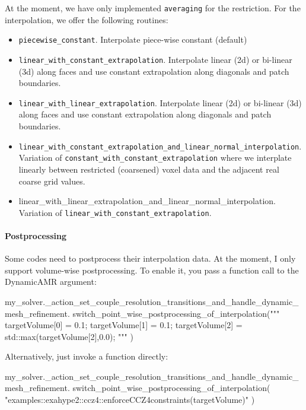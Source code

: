 At the moment, we have only implemented \texttt{averaging} for the restriction. 
For the interpolation, we offer the following routines:

\begin{itemize}
  \item \texttt{piecewise\_constant}. Interpolate piece-wise constant (default) 
  \item \texttt{linear\_with\_constant\_extrapolation}. Interpolate linear (2d) or
  bi-linear (3d) along faces and use constant extrapolation along diagonals and
  patch boundaries.
  \item \texttt{linear\_with\_linear\_extrapolation}. Interpolate linear (2d) or
  bi-linear (3d) along faces and use constant extrapolation along diagonals and
  patch boundaries.
  \item \texttt{linear\_with\_constant\_extrapolation\_and\_linear\_normal\_interpolation}.
  Variation of \texttt{constant\_with\_constant\_extrapolation} where we
  interplate linearly between restricted (coarsened) voxel data and the adjacent real
  coarse grid values. 
  \item{linear\_with\_linear\_extrapolation\_and\_linear\_normal\_interpolation}. \linebreak
  Variation of \texttt{linear\_with\_constant\_extrapolation}. 
\end{itemize}


\paragraph{Postprocessing}
%
%
%
Some codes need to postprocess their interpolation data. At the moment, I only support volume-wise postprocessing.
To enable it, you pass a function call to the DynamicAMR argument: 
\begin{code}
my_solver._action_set_couple_resolution_transitions_and_handle_dynamic_mesh_refinement.
  switch_point_wise_postprocessing_of_interpolation("""
  targetVolume[0] = 0.1;
  targetVolume[1] = 0.1;
  targetVolume[2] = std::max(targetVolume[2],0.0);
  """ )
\end{code}

\noindent
Alternatively, just invoke a function directly:

\begin{code}
my_solver._action_set_couple_resolution_transitions_and_handle_dynamic_mesh_refinement.
  switch_point_wise_postprocessing_of_interpolation(
  "examples::exahype2::ccz4::enforceCCZ4constraints(targetVolume)" )
\end{code}

